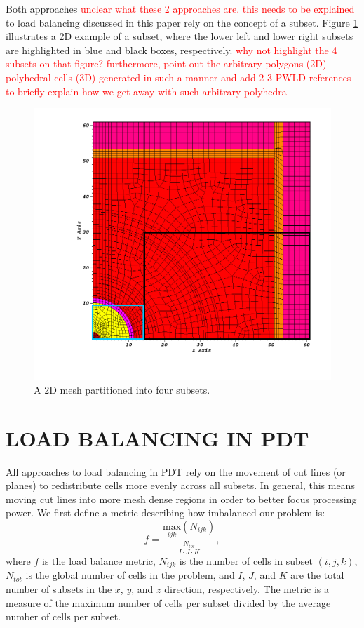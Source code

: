 \documentclass[letterpaper]{mandc2019}
\newcommand{\jcr}[1]{\textcolor{red}{#1}}
\begin{document}
Both approaches \jcr{unclear what these 2 approaches are. this needs to be explained} to load balancing discussed in this paper rely on the concept of a subset. Figure \ref{subset_example} illustrates a 2D example of a subset, where the lower left and lower right subsets are highlighted in blue and black boxes, respectively. \jcr{why not highlight the 4 subsets on that figure?} \jcr{furthermore, point out the arbitrary polygons (2D) polyhedral cells (3D) generated in such a manner and add 2-3 PWLD references to briefly explain how we get away with such arbitrary polyhedra}

\begin{figure}[H]
\centering
\includegraphics[scale=0.5,trim={3cm 2cm 1cm 1cm},clip]{figures/subset_example.png}
\caption{A 2D mesh partitioned into four subsets.}
\label{subset_example}
\end{figure}

\section{LOAD BALANCING IN PDT}

All approaches to load balancing in PDT rely on the movement of cut lines (or planes) to redistribute cells more evenly across all subsets. In general, this means moving cut lines into more mesh dense regions in order to better focus processing power. We first define a metric describing how imbalanced our problem is:
\begin{equation}
f =\frac{\underset{ijk}{\text{max}}(N_{ijk})}{\frac{N_{tot}}{I\cdot J\cdot K}},
\label{metric_def}
\end{equation}
where $f$ is the load balance metric, $N_{ijk}$ is the number of cells in subset $(i,j,k)$, $N_{tot}$ is the global number of cells in the problem, and $I$, $J$, and $K$ are the total number of subsets in the $x$, $y$, and $z$ direction, respectively. The metric is a measure of the maximum number of cells per subset divided by the average number of cells per subset.
\end{document}
